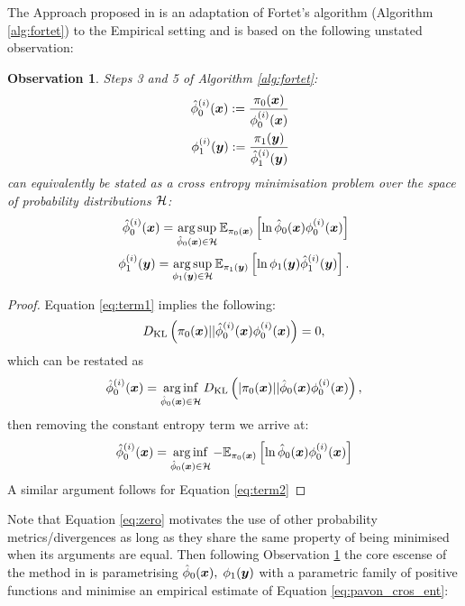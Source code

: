 \documentclass[a4paper,12pt,twoside,openright]{report}
\newtheorem{observation}[theorem]{Observation}
\theoremstyle{definition}
\begin{document}
The Approach proposed in \cite{pavon2018data} is an adaptation of Fortet's algorithm (Algorithm \ref{alg:fortet}) to the Empirical setting and is based on the following unstated observation:
\begin{observation}\label{obs:pavon}
Steps 3 and 5 of Algorithm \ref{alg:fortet}:
\begin{align}
    {\hat{\phi}}_0^{(i)}({\bm{x}}) := \frac{\pi_0({\bm{x}})}{\phi_0^{(i)}({\bm{x}})} \label{eq:term1}\\    \quad \phi_1^{(i)}({\bm{y}}) := \frac{\pi_1({\bm{y}})}{{\hat{\phi}}_1^{(i)}({\bm{y}})}  \label{eq:term2}
\end{align}
can equivalently be stated as a cross entropy minimisation problem over the space of probability distributions ${\mathcal{H}}$:
\begin{align} \label{eq:pavon_cros_ent}
   {\hat{\phi}}_0^{(i)}({\bm{x}})= \operatorname*{arg\,sup}_{{\hat{\phi}}_0({\bm{x}}) \in {\mathcal{H}}} \mathbb{E}_{\pi_0({\bm{x}})} \left[\operatorname{ln} {\hat{\phi}}_0({\bm{x}})   \phi_0^{(i)}({\bm{x}})\right]\\
   \phi_1^{(i)}({\bm{y}})= \operatorname*{arg\,sup}_{\phi_1({\bm{y}}) \in {\mathcal{H}}} \mathbb{E}_{\pi_1({\bm{y}})} \left[\operatorname{ln} \phi_1({\bm{y}})   {\hat{\phi}}_1^{(i)}({\bm{y}})\right].
\end{align}
\end{observation}
\begin{proof}
Equation \ref{eq:term1}  implies the following:
\begin{align}\label{eq:zero}
    D_{\mathrm{KL}}\left(\pi_0({\bm{x}}) || {\hat{\phi}}_0^{(i)}({\bm{x}})   \phi_0^{(i)}({\bm{x}}) \right)  = 0 ,
\end{align} 
which can be restated as
\begin{align}
   {\hat{\phi}}_0^{(i)}({\bm{x}}) = \operatorname*{arg\,inf}_{{\hat{\phi}}_0({\bm{x}})\in \mathcal{H}} D_{\mathrm{KL}}\left(|\pi_0({\bm{x}}) || {\hat{\phi}}_0({\bm{x}})   \phi_0^{(i)}({\bm{x}}) \right),  
\end{align} 
then removing the constant entropy term we arrive at:
\begin{align*}
   {\hat{\phi}}_0^{(i)}({\bm{x}})= \operatorname*{arg\,inf}_{{\hat{\phi}}_0({\bm{x}}) \in {\mathcal{H}}} -\mathbb{E}_{\pi_0({\bm{x}})} \left[\operatorname{ln} {\hat{\phi}}_0({\bm{x}})   \phi_0^{(i)}({\bm{x}})\right]
\end{align*}
A similar argument follows for Equation \ref{eq:term2}
\end{proof}
Note that Equation \ref{eq:zero} motivates the use of other probability metrics/divergences as long as they share the same property of being minimised  when its arguments are equal. Then following Observation \ref{obs:pavon} the core escense of the method in \cite{pavon2018data} is parametrising  ${\hat{\phi}}_0({\bm{x}}), \;  \phi_1({\bm{y}}) $ with a parametric family of positive functions and minimise an empirical estimate of Equation \ref{eq:pavon_cros_ent}:
\end{document}
